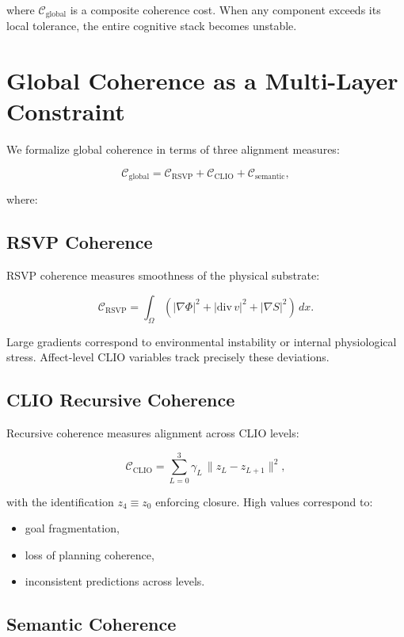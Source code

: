 \documentclass[12pt,oneside]{book}
\theoremstyle{plain}
\theoremstyle{definition}
\begin{document}
where $\mathcal{C}_{\mathrm{global}}$ is a composite coherence cost.
When any component exceeds its local tolerance, the entire cognitive stack
becomes unstable.

\section{Global Coherence as a Multi-Layer Constraint}

We formalize global coherence in terms of three alignment measures:

\[
\mathcal{C}_{\mathrm{global}}
=
\mathcal{C}_{\mathrm{RSVP}}
+
\mathcal{C}_{\mathrm{CLIO}}
+
\mathcal{C}_{\mathrm{semantic}},
\]

where:

\subsection{RSVP Coherence}

RSVP coherence measures smoothness of the physical substrate:

\[
\mathcal{C}_{\mathrm{RSVP}}
=
\int_{\Omega}
\left(
    |\nabla \Phi|^2
  + |\mathrm{div}\, v|^2
  + |\nabla S|^2
\right)\, dx.
\]

Large gradients correspond to environmental instability or internal
physiological stress.
Affect-level CLIO variables track precisely these deviations.

\subsection{CLIO Recursive Coherence}

Recursive coherence measures alignment across CLIO levels:

\[
\mathcal{C}_{\mathrm{CLIO}}
=
\sum_{L=0}^{3}
\gamma_L\, \lVert z_L - z_{L+1} \rVert^2,
\]

with the identification $z_4 \equiv z_0$ enforcing closure.
High values correspond to:

\begin{itemize}
    \item goal fragmentation,
    \item loss of planning coherence,
    \item inconsistent predictions across levels.
\end{itemize}

\subsection{Semantic Coherence}
\end{document}
